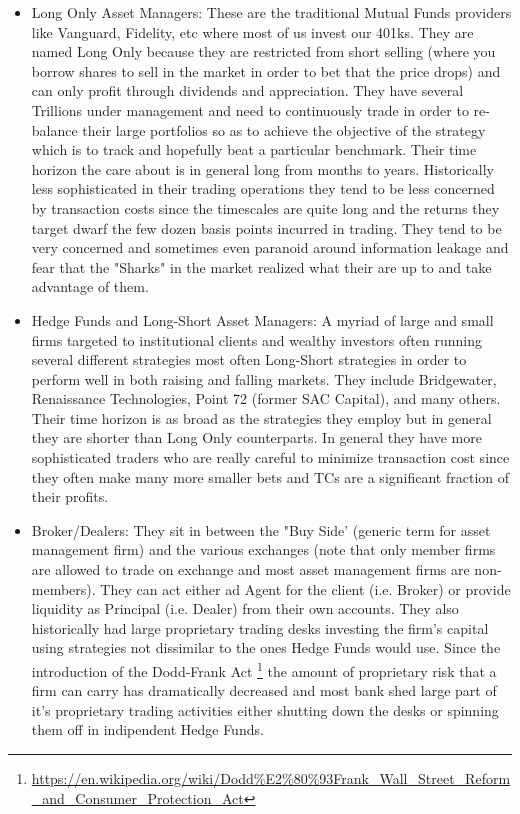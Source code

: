 \begin{itemize}
\item Long Only Asset Managers: These are the traditional Mutual Funds providers like Vanguard, Fidelity, etc where most of us invest our 401ks.  They are named Long Only because they are restricted from short selling (where you borrow shares to sell in the market in order to bet that the price drops) and can only profit through dividends and appreciation. They have several Trillions under management and need to continuously trade in order to re-balance their large portfolios so as to achieve the objective of the strategy which is to track and hopefully beat a particular benchmark. Their time horizon the care about is in general long from months to years. Historically less sophisticated in their trading operations they tend to be less concerned by transaction costs since the timescales are quite long and the returns they target dwarf the few dozen basis points incurred in trading. They tend to be very concerned and sometimes even paranoid around information leakage and fear that the "Sharks" in the market realized what their are up to and take advantage of them. 

\item Hedge Funds and Long-Short Asset Managers: A myriad of large and small firms targeted to institutional clients and wealthy investors often running  several different strategies most often Long-Short strategies in order to perform well in both raising and falling markets. They include Bridgewater, Renaissance Technologies, Point 72 (former SAC Capital), and many others.  Their time horizon is as broad as the strategies they employ but in general they are shorter than Long Only counterparts. In general they have more sophisticated traders who are really careful to minimize transaction cost since they often make many more smaller bets and TCs are a significant fraction of their profits.

\item Broker/Dealers:  They sit in between the "Buy Side' (generic term for asset management firm) and the various exchanges (note that only member firms are allowed to trade on exchange and most asset management firms are non-members). They can act either ad Agent for the client (i.e. Broker) or provide liquidity as Principal (i.e. Dealer) from their own accounts. They also historically had large proprietary trading desks investing the firm's capital using strategies not dissimilar to the ones Hedge Funds would use. Since the introduction of the Dodd-Frank Act \footnote{\url{https://en.wikipedia.org/wiki/Dodd\%E2\%80\%93Frank_Wall_Street_Reform_and_Consumer_Protection_Act}} the amount of proprietary risk that a firm can carry has dramatically decreased and most bank shed large part of it's proprietary trading activities either shutting down the desks or spinning them off in indipendent Hedge Funds.


\end{itemize}
